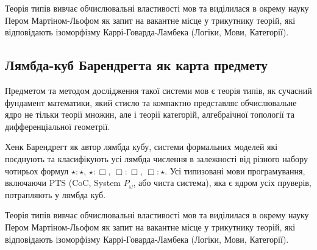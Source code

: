 Теорія типів вивчає обчислювальні властивості мов та виділилася
в окрему науку Пером Мартіном-Льофом як запит на вакантне місце
у трикутнику теорій, які відповідають ізоморфізму
Каррі-Говарда-Ламбека (Логіки, Мови, Категорії).

\subsection*{Лямбда-куб Барендрегта як карта предмету}
Предметом та методом дослідження такої системи мов є теорія типів,
як сучасний фундамент математики, який стисло та компактно представляє
обчислювальне ядро не тільки теорії множин,
але і теорії категорій, алгебраїчної топології та дифференціальної геометрії.

Хенк Барендрегт як автор лямбда кубу, системи формальних
моделей які поєднують та класифікують усі лямбда числення в
залежності від різного набору чотирьох формул $\star : \star$,
$\star : \Box$, $\Box : \Box$, $\Box : \star$. Усі типизовані мови
програмування, включаючи PTS (CoC, System $P_\omega$, або чиста система),
яка є ядром усіх пруверів, потрапляють у лямбда куб.

\begin{center}
\end{center}

Теорія типів вивчає обчислювальні властивості мов та виділилася
в окрему науку Пером Мартіном-Льофом як запит на вакантне місце у
трикутнику теорій, які відповідають ізоморфізму
Каррі-Говарда-Ламбека (Логіки, Мови, Категорії).


